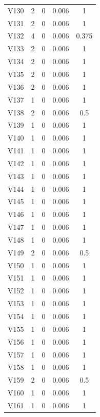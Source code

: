 \documentclass[a4paper, 12pt, openright, oneside, german, french, english, brazil]{abntex2}
\begin{document}
\begin{SingleSpace}
\begin{footnotesize}
\begin{center}
\begin{longtable}{c c c c c}
					V130 & 2 & 0 & 0.006 & 1 \\ 
					V131 & 2 & 0 & 0.006 & 1 \\ 
					V132 & 4 & 0 & 0.006 & 0.375 \\ 
					V133 & 2 & 0 & 0.006 & 1 \\ 
					V134 & 2 & 0 & 0.006 & 1 \\ 
					V135 & 2 & 0 & 0.006 & 1 \\ 
					V136 & 2 & 0 & 0.006 & 1 \\ 
					V137 & 1 & 0 & 0.006 & 1 \\ 
					V138 & 2 & 0 & 0.006 & 0.5 \\ 
					V139 & 1 & 0 & 0.006 & 1 \\ 
					V140 & 1 & 0 & 0.006 & 1 \\ 
					V141 & 1 & 0 & 0.006 & 1 \\ 
					V142 & 1 & 0 & 0.006 & 1 \\ 
					V143 & 1 & 0 & 0.006 & 1 \\ 
					V144 & 1 & 0 & 0.006 & 1 \\ 
					V145 & 1 & 0 & 0.006 & 1 \\ 
					V146 & 1 & 0 & 0.006 & 1 \\ 
					V147 & 1 & 0 & 0.006 & 1 \\ 
					V148 & 1 & 0 & 0.006 & 1 \\ 
					V149 & 2 & 0 & 0.006 & 0.5 \\ 
					V150 & 1 & 0 & 0.006 & 1 \\ 
					V151 & 1 & 0 & 0.006 & 1 \\ 
					V152 & 1 & 0 & 0.006 & 1 \\ 
					V153 & 1 & 0 & 0.006 & 1 \\ 
					V154 & 1 & 0 & 0.006 & 1 \\ 
					V155 & 1 & 0 & 0.006 & 1 \\ 
					V156 & 1 & 0 & 0.006 & 1 \\ 
					V157 & 1 & 0 & 0.006 & 1 \\ 
					V158 & 1 & 0 & 0.006 & 1 \\ 
					V159 & 2 & 0 & 0.006 & 0.5 \\ 
					V160 & 1 & 0 & 0.006 & 1 \\ 
					V161 & 1 & 0 & 0.006 & 1 \\  
					
				\end{longtable}
			\end{center}
		\end{footnotesize}
	\end{SingleSpace}
\end{document}
